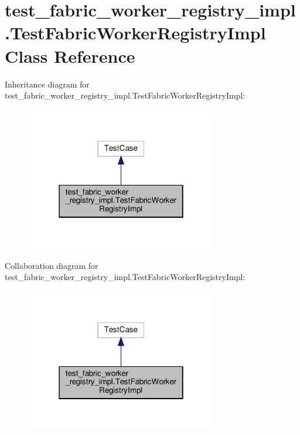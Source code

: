 \hypertarget{classtest__fabric__worker__registry__impl_1_1TestFabricWorkerRegistryImpl}{}\section{test\+\_\+fabric\+\_\+worker\+\_\+registry\+\_\+impl.\+Test\+Fabric\+Worker\+Registry\+Impl Class Reference}
\label{classtest__fabric__worker__registry__impl_1_1TestFabricWorkerRegistryImpl}


Inheritance diagram for test\+\_\+fabric\+\_\+worker\+\_\+registry\+\_\+impl.\+Test\+Fabric\+Worker\+Registry\+Impl\+:
\nopagebreak
\begin{figure}[H]
\begin{center}
\leavevmode
\includegraphics[width=238pt]{classtest__fabric__worker__registry__impl_1_1TestFabricWorkerRegistryImpl__inherit__graph}
\end{center}
\end{figure}


Collaboration diagram for test\+\_\+fabric\+\_\+worker\+\_\+registry\+\_\+impl.\+Test\+Fabric\+Worker\+Registry\+Impl\+:
\nopagebreak
\begin{figure}[H]
\begin{center}
\leavevmode
\includegraphics[width=238pt]{classtest__fabric__worker__registry__impl_1_1TestFabricWorkerRegistryImpl__coll__graph}
\end{center}
\end{figure}
